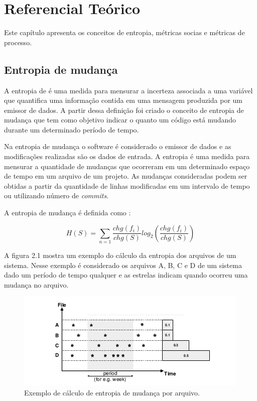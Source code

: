 \chapter{Referencial Teórico}
Este capítulo apresenta os conceitos de entropia, métricas socias e métricas de processo.

\section{Entropia de mudança}
A entropia de  é uma medida para mensurar a incerteza associada a uma variável que quantifica uma informação contida em uma mensagem produzida por um emissor de dados. A partir dessa definição foi criado o conceito de entropia de mudança que tem como objetivo indicar o quanto um código está mudando durante um determinado período de tempo. 

Na entropia de mudança o software é considerado o emissor de dados e as modificações realizadas são os dados de entrada. A entropia é uma medida para mensurar a quantidade de mudanças que ocorreram em um determinado espaço de tempo em um arquivo de um projeto. As mudanças consideradas podem ser obtidas a partir da quantidade de linhas modificadas em um intervalo de tempo ou utilizando número de \textit{commits}.

A entropia de mudança é definida como \cite{Hassan:2009:PFU:1555001.1555024}:

\begin{equation}
H(S) = {\sum\limits_{n=1} }\frac{chg(f_i)}{chg(S)}log_2(\frac{chg(f_i)}{chg(S)})
\end{equation}

A figura 2.1 mostra um exemplo do cálculo da entropia dos arquivos de um sistema\cite{Hassan:2009:PFU:1555001.1555024}. Nesse exemplo é considerado os arquivos A, B, C e D de um sistema dado um período de tempo qualquer e as estrelas indicam quando ocorreu uma mudança no arquivo.

\begin{figure}[h]
	\captionsetup{justification=centering}
	\includegraphics[width=\linewidth]{entropiamudanca.png}
	\caption{Exemplo de cálculo de entropia de mudança por arquivo.}
	\label{figura:entropiaimagem}
\end{figure}

